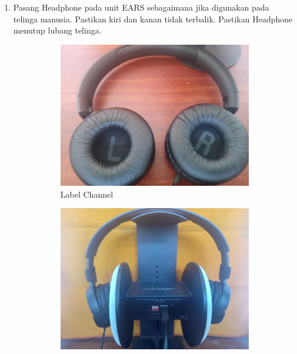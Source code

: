 \documentclass[12pt]{book}
\begin{document}
	\begin{enumerate}
		\item Pasang Headphone pada unit EARS sebagaimana jika digunakan pada telinga manusia.
		Pastikan kiri dan kanan tidak terbalik.
		Pastikan Headphone menutup lubang telinga.

		\begin{figure}[!ht]
			\centering
			\begin{subfigure}[t]{0.35\textwidth}
				\includegraphics[width=\textwidth]{images/pasang/chjbl}
				\caption{Label Channel}
			\end{subfigure}
			\begin{subfigure}[t]{0.35\textwidth}
				\includegraphics[width=\textwidth]{images/pasang/pasangjbl}

\end{subfigure}
\end{figure}
\end{enumerate}
\end{document}
